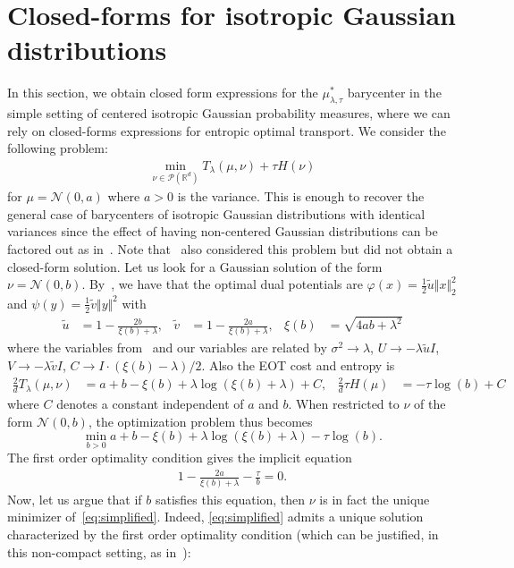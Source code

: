 \documentclass[11pt]{article}
\newcommand{\RR}{\mathbb{R}}
\newcommand{\Nn}{\mathcal{N}}
\newcommand{\Pp}{\mathcal{P}}
\begin{document}
\section{Closed-forms for isotropic Gaussian distributions}\label{app:gaussians}
In this section, we obtain closed form expressions for the $\mu^*_{\lambda,\tau}$ barycenter in the simple setting of centered isotropic Gaussian probability measures, where we can rely on closed-forms expressions for entropic optimal transport. We consider the following problem:
\begin{align}\label{eq:simplified}
\min_{\nu\in \Pp(\RR^d)} T_\lambda(\mu,\nu) + \tau H(\nu)
\end{align}
for $\mu=\Nn(0,a)$ where $a>0$ is the variance. This is enough to recover the general case of barycenters of isotropic Gaussian distributions with identical variances since the effect of having non-centered Gaussian distributions can be factored out as in~\cite{janati2020entropic}. Note that~\cite{ballu2020stochastic} also considered this problem but did not obtain a closed-form solution.  Let us look for a Gaussian solution of the form $\nu = \Nn(0,b)$. By~\cite{janati2020entropic}, we have that the optimal dual potentials are $\varphi(x)=\frac12 \tilde u \Vert x\Vert_2^2$ and $\psi(y)=\frac12 \tilde v \Vert y\Vert^2$ with
\begin{align*}
\tilde u &= 1 - \frac{2b}{\xi(b)+\lambda},&
\tilde v &= 1 - \frac{2a}{\xi(b)+\lambda},&
\xi(b) &=  \sqrt{4ab+\lambda^2}
\end{align*}
where the variables from~\cite{janati2020entropic} and our variables are related by $\sigma^2 \rightarrow \lambda$, $U \rightarrow-\lambda \tilde u I$, $V \rightarrow -\lambda \tilde v I$, $C \rightarrow I\cdot (\xi(b)-\lambda)/2$. Also the EOT cost and entropy is
\begin{align*}
\frac{2}{d}T_\lambda(\mu,\nu) &= a+b - \xi(b) +\lambda \log(\xi(b)+\lambda)+C,& \frac{2}{d}\tau H(\mu) &=-\tau \log(b)+C
\end{align*}
where $C$ denotes a constant independent of $a$ and $b$. When restricted to $\nu$ of the form $\Nn(0,b)$, the optimization problem thus becomes
$$
\min_{b>0} a+b - \xi(b) +\lambda \log(\xi(b)+\lambda)-\tau \log(b).
$$
The first order optimality condition gives the implicit equation
\begin{align}\label{eq:sol-gaussian}
1- \frac{2a}{\xi(b)+\lambda}-\frac{\tau}{b}=0.
\end{align}
Now, let us argue that if $b$ satisfies this equation, then $\nu$ is in fact the unique minimizer of~\eqref{eq:simplified}. Indeed, \eqref{eq:simplified} admits a unique solution characterized by the first order optimality condition (which can be justified, in this non-compact setting, as in~\cite{janati2020entropic}):
\end{document}
